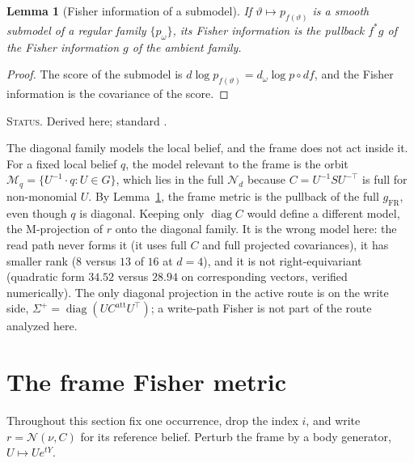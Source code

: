 \documentclass[11pt]{article}
\newtheorem{lemma}[theorem]{Lemma}
\theoremstyle{definition}
\theoremstyle{remark}
\newcommand{\Normal}{\mathcal{N}}
\newcommand{\status}[1]{\par\smallskip\noindent\textsc{Status.} #1\par\smallskip}
\begin{document}
\begin{lemma}[Fisher information of a submodel]\label{lem:submodel}
If $\vartheta\mapsto p_{f(\vartheta)}$ is a smooth submodel of a regular family $\{p_\omega\}$, its Fisher information is the pullback $f^*g$ of the Fisher information $g$ of the ambient family.
\end{lemma}
\begin{proof}
The score of the submodel is $d\log p_{f(\vartheta)}=d_\omega\log p\circ df$, and the Fisher information is the covariance of the score.
\end{proof}
\status{Derived here; standard \cite{AmariNagaoka2000}.}

The diagonal family models the local belief, and the frame does not act inside it. For a fixed local belief $q$, the model relevant to the frame is the orbit $\mathcal{M}_q=\{U^{-1}\cdot q:U\in G\}$, which lies in the full $\Normal_d$ because $C=U^{-1}SU^{-\top}$ is full for non-monomial $U$. By Lemma~\ref{lem:submodel}, the frame metric is the pullback of the full $g_{\mathrm{FR}}$, even though $q$ is diagonal. Keeping only $\operatorname{diag}C$ would define a different model, the M-projection of $r$ onto the diagonal family. It is the wrong model here: the read path never forms it (it uses full $C$ and full projected covariances), it has smaller rank ($8$ versus $13$ of $16$ at $d=4$), and it is not right-equivariant (quadratic form $34.52$ versus $28.94$ on corresponding vectors, verified numerically). The only diagonal projection in the active route is on the write side, $\Sigma^+=\operatorname{diag}(UC^{\mathrm{att}}U^\top)$; a write-path Fisher is not part of the route analyzed here.

\section{The frame Fisher metric}\label{sec:fisher}

Throughout this section fix one occurrence, drop the index $i$, and write $r=\Normal(\nu,C)$ for its reference belief. Perturb the frame by a body generator, $U\mapsto Ue^{tY}$.
\end{document}
